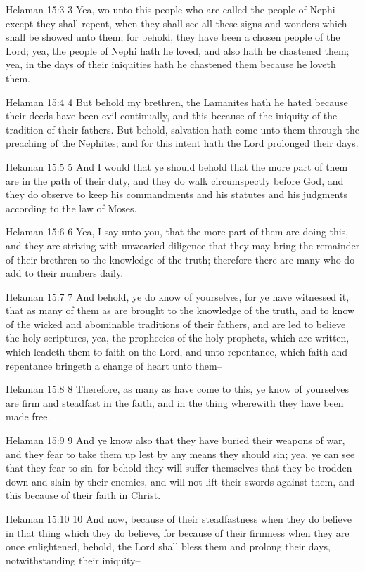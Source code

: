 Helaman 15:3
 3 Yea, wo unto this people who are called the people of Nephi
except they shall repent, when they shall see all these signs and
wonders which shall be showed unto them; for behold, they have
been a chosen people of the Lord; yea, the people of Nephi hath
he loved, and also hath he chastened them; yea, in the days of
their iniquities hath he chastened them because he loveth them.

Helaman 15:4
 4 But behold my brethren, the Lamanites hath he hated because
their deeds have been evil continually, and this because of the
iniquity of the tradition of their fathers. But behold,
salvation hath come unto them through the preaching of the
Nephites; and for this intent hath the Lord prolonged their days.

Helaman 15:5
 5 And I would that ye should behold that the more part of them
are in the path of their duty, and they do walk circumspectly
before God, and they do observe to keep his commandments and his
statutes and his judgments according to the law of Moses.

Helaman 15:6
 6 Yea, I say unto you, that the more part of them are doing
this, and they are striving with unwearied diligence that they
may bring the remainder of their brethren to the knowledge of the
truth; therefore there are many who do add to their numbers
daily.

Helaman 15:7
 7 And behold, ye do know of yourselves, for ye have witnessed
it, that as many of them as are brought to the knowledge of the
truth, and to know of the wicked and abominable traditions of
their fathers, and are led to believe the holy scriptures, yea,
the prophecies of the holy prophets, which are written, which
leadeth them to faith on the Lord, and unto repentance, which
faith and repentance bringeth a change of heart unto them--

Helaman 15:8
 8 Therefore, as many as have come to this, ye know of yourselves
are firm and steadfast in the faith, and in the thing wherewith
they have been made free.

Helaman 15:9
 9 And ye know also that they have buried their weapons of war,
and they fear to take them up lest by any means they should sin;
yea, ye can see that they fear to sin--for behold they will
suffer themselves that they be trodden down and slain by their
enemies, and will not lift their swords against them, and this
because of their faith in Christ.

Helaman 15:10
 10 And now, because of their steadfastness when they do believe
in that thing which they do believe, for because of their
firmness when they are once enlightened, behold, the Lord shall
bless them and prolong their days, notwithstanding their
iniquity--

